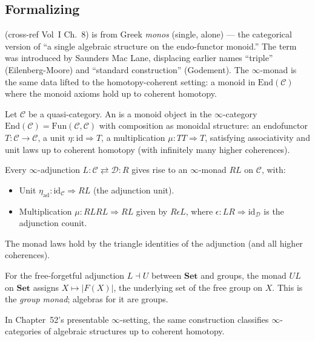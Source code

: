 \subsection{Formalizing}

\begin{nameorigin}
 (cross-ref Vol~I Ch.~8) is from Greek \emph{monos} (single,
alone) — the categorical version of ``a single algebraic structure on
the endo-functor monoid.'' The term was introduced by Saunders Mac Lane,
displacing earlier names ``triple'' (Eilenberg-Moore) and ``standard
construction'' (Godement). The $\infty$-monad is the same data lifted
to the homotopy-coherent setting: a monoid in $\mathrm{End}(\mathcal{C})$
where the monoid axioms hold up to coherent homotopy.
\end{nameorigin}

\begin{definition}
\label{def:infty-monad}
Let $\mathcal{C}$ be a quasi-category. An  is a monoid object in the $\infty$-category
$\mathrm{End}(\mathcal{C}) = \mathrm{Fun}(\mathcal{C}, \mathcal{C})$
with composition as monoidal structure: an endofunctor $T : \mathcal{C}
\to \mathcal{C}$, a unit $\eta : \mathrm{id} \Rightarrow T$, a
multiplication $\mu : TT \Rightarrow T$, satisfying associativity and
unit laws up to coherent homotopy (with infinitely many higher coherences).
\end{definition}

\begin{theorem}
\label{thm:monad-from-adj}
Every $\infty$-adjunction $L : \mathcal{C} \rightleftarrows \mathcal{D} : R$
gives rise to an $\infty$-monad $RL$ on $\mathcal{C}$, with:
\begin{itemize}
  \item Unit $\eta_{\mathrm{ad}} : \mathrm{id}_\mathcal{C} \Rightarrow RL$ (the adjunction unit).
  \item Multiplication $\mu : RLRL \Rightarrow RL$ given by $R \epsilon L$,
        where $\epsilon : LR \Rightarrow \mathrm{id}_\mathcal{D}$ is the
        adjunction counit.
\end{itemize}
The monad laws hold by the triangle identities of the adjunction (and
all higher coherences).
\end{theorem}

\begin{example_thm}
\label{ex:free-forgetful}
For the free-forgetful adjunction $L \dashv U$ between $\mathbf{Set}$
and groups, the monad $UL$ on $\mathbf{Set}$ assigns $X \mapsto |F(X)|$,
the underlying set of the free group on $X$. This is the \emph{group
monad}; algebras for it are groups.

In Chapter~52's presentable $\infty$-setting, the same construction
classifies $\infty$-categories of algebraic structures up to coherent
homotopy.
\end{example_thm}

